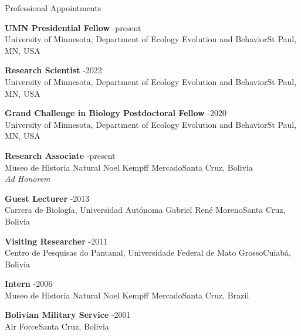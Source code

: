\documentclass{resume} %
\begin{document}
\begin{rSection}{Professional Appointments}

{\bf UMN Presidential Fellow} \hfill {-present} \\
{\normalfont University of Minnesota, Department of Ecology Evolution and Behavior}\hfill {\normalfont St Paul, MN, USA}

{\bf Research Scientist} \hfill {-2022} \\
{\normalfont University of Minnesota, Department of Ecology Evolution and Behavior}\hfill {\normalfont St Paul, MN, USA} 

{\bf Grand Challenge in Biology Postdoctoral Fellow} \hfill {-2020} \\
{\normalfont University of Minnesota, Department of Ecology Evolution and Behavior}\hfill {\normalfont St Paul, MN, USA} 

{\bf Research Associate} \hfill {-present} \\
{\normalfont Museo de Historia Natural Noel Kempff Mercado}\hfill {\normalfont Santa Cruz, Bolivia} \\
\emph{\normalfont Ad Honorem} 

{\bf Guest Lecturer} \hfill {-2013} \\
{\normalfont Carrera de Biología, Universidad Autónoma Gabriel René Moreno}\hfill {\normalfont Santa Cruz, Bolivia} 

{\bf Visiting Researcher} \hfill {-2011} \\
{\normalfont Centro de Pesquisas do Pantanal, Universidade Federal de Mato Grosso}\hfill {\normalfont Cuiabá, Bolivia} 

{\bf Intern} \hfill {-2006} \\
{\normalfont Museo de Historia Natural Noel Kempff Mercado}\hfill {\normalfont Santa Cruz, Brazil} 

{\bf Bolivian Military Service} \hfill {-2001} \\
{\normalfont Air Force}\hfill {\normalfont Santa Cruz, Bolivia} 
\end{rSection}


\end{document}
